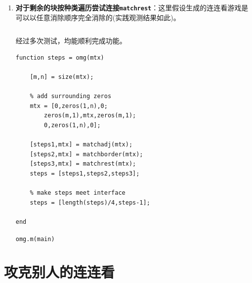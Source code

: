 \documentclass{article}
\numberwithin{figure}{section}
\numberwithin{table}{section}
\numberwithin{listing}{section}
\numberwithin{equation}{section}
\begin{document}
\begin{enumerate}
\begin{enumerate}
                    \item \textbf{对于剩余的块按种类遍历尝试连接\texttt{matchrest}}：这里假设生成的连连看游戏是可以以任意消除顺序完全消除的(实践观测结果如此)。

                        \inputminted[firstline=138,lastline=164]{matlab}{../linkgame/omg.m}
                        \begingroup
                        \endgroup

                        经过多次测试，均能顺利完成功能。

                        \begin{listing}[H]
                            \begin{verbatim}
function steps = omg(mtx)
    
    [m,n] = size(mtx);
    
    % add surrounding zeros
    mtx = [0,zeros(1,n),0;
        zeros(m,1),mtx,zeros(m,1);
        0,zeros(1,n),0];
    
    [steps1,mtx] = matchadj(mtx);
    [steps2,mtx] = matchborder(mtx);
    [steps3,mtx] = matchrest(mtx);
    steps = [steps1,steps2,steps3];
    
    % make steps meet interface
    steps = [length(steps)/4,steps-1];

end
                            \end{verbatim}
                            \caption{\texttt{omg.m(main)}}
                        \end{listing}

                \end{enumerate}

        \end{enumerate}


    \newpage
    \section{攻克别人的连连看} %
    \label{sec:攻克别人的连连看}
\end{document}
